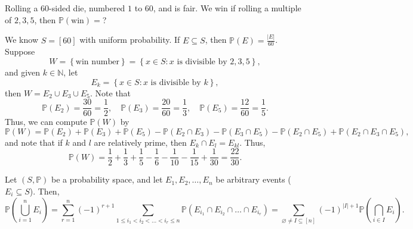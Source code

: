 \begin{eg}
    Rolling a \(60\)-sided die, numbered \(1\) to \(60\), and is fair. We win if rolling a multiple of \(2, 3, 5\), then \(\mathbb{P} (\text{win} )=\)?     
\end{eg}

\begin{explanation}
    We know \(S=[60]\) with uniform probability. If \(E \subseteq S\), then \(\mathbb{P} (E) = \frac{\vert E \vert }{60}\). Suppose
    \[
        W = \left\{ \text{win number}  \right\} = \left\{ x \in S: x \text{ is divisible by } 2,3,5  \right\},  
    \]    
    and given \(k \in \mathbb{N} \), let 
    \[
        E_k = \left\{ x \in S: x \text{ is divisible by } k  \right\}, 
    \] 
    then \(W = E_2 \cup E_3 \cup E_5\). Note that 
    \[
        \mathbb{P} (E_2) = \frac{30}{60} = \frac{1}{2}, \quad \mathbb{P} (E_3) = \frac{20}{60} = \frac{1}{3}, \quad \mathbb{P} (E_5) = \frac{12}{60} = \frac{1}{5}.
    \] 
    Thus, we can compute \(\mathbb{P} (W)\) by 
    \[
        \mathbb{P} (W) = \mathbb{P} (E_2) + \mathbb{P} (E_3) + \mathbb{P} (E_5) - \mathbb{P} (E_2 \cap E_3) - \mathbb{P} (E_3 \cap E_5) - \mathbb{P} (E_2 \cap E_5) + \mathbb{P} (E_2 \cap E_3 \cap E_5),
    \] 
    and note that if \(k\) and \(l\) are relatively prime, then \(E_k \cap E_l = E_{kl}\). Thus,
    \[
        \mathbb{P} (W) = \frac{1}{2} + \frac{1}{3} + \frac{1}{5} - \frac{1}{6} - \frac{1}{10} - \frac{1}{15} + \frac{1}{30} = \frac{22}{30}.
    \]   
\end{explanation}

\begin{theorem}
    Let \((S, \mathbb{P} )\) be a probability space, and let \(E_1, E_2, \dots , E_n\) be arbitrary events (\(E_i \subseteq S\)). Then, 
    \[
        \mathbb{P} \left( \bigcup_{i=1}^{n} E_i  \right) = \sum_{r=1}^n (-1)^{r+1} \sum_{1 \le i_1 < i_2 < \dots < i_r \le n} \mathbb{P} (E_{i_1} \cap E_{i_2} \cap \dots \cap E_{i_r}) = \sum_{\varnothing \neq I \subseteq [n]} (-1)^{\vert I \vert + 1 } \mathbb{P} \left( \bigcap_{i \in I} E_i  \right) .   
    \]  
\end{theorem}


